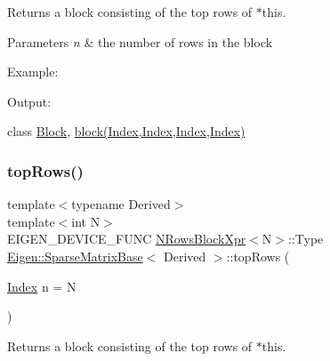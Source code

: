 \begin{DoxyReturn}{Returns}
a block consisting of the top rows of $\ast$this.
\end{DoxyReturn}

\begin{DoxyParams}{Parameters}
{\em n} & the number of rows in the block\\
\hline
\end{DoxyParams}
Example\+: 
\begin{DoxyCodeInclude}{0}
\end{DoxyCodeInclude}
 Output\+: 
\begin{DoxyVerbInclude}
\end{DoxyVerbInclude}
 class \mbox{\hyperlink{class_eigen_1_1_block}{Block}}, \mbox{\hyperlink{class_eigen_1_1_sparse_matrix_base_a7c28a2f511181c727396d5e813519d38}{block(\+Index,\+Index,\+Index,\+Index)}} \mbox{\label{class_eigen_1_1_sparse_matrix_base_ae3eb4237ad09ee6313969049cc8f856a}} 
\subsubsection{\texorpdfstring{topRows()}{topRows()}\hspace{0.1cm}{\footnotesize\ttfamily [2/2]}}
{\footnotesize\ttfamily template$<$typename Derived$>$ \\
template$<$int N$>$ \\
E\+I\+G\+E\+N\+\_\+\+D\+E\+V\+I\+C\+E\+\_\+\+F\+U\+NC \mbox{\hyperlink{struct_eigen_1_1_sparse_matrix_base_1_1_n_rows_block_xpr}{N\+Rows\+Block\+Xpr}}$<$N$>$\+::Type \mbox{\hyperlink{class_eigen_1_1_sparse_matrix_base}{Eigen\+::\+Sparse\+Matrix\+Base}}$<$ Derived $>$\+::top\+Rows (\begin{DoxyParamCaption}\item[{\mbox{\hyperlink{struct_eigen_1_1_eigen_base_a554f30542cc2316add4b1ea0a492ff02}{Index}}}]{n = {\ttfamily N} }\end{DoxyParamCaption})\hspace{0.3cm}{\ttfamily [inline]}}

\begin{DoxyReturn}{Returns}
a block consisting of the top rows of $\ast$this.
\end{DoxyReturn}

